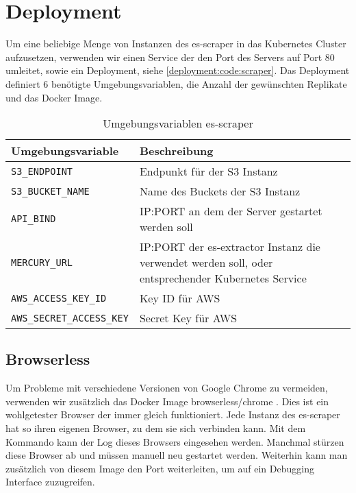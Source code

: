\section{Deployment} \label{scraper:sec:deployment}
Um eine beliebige Menge von Instanzen des es-scraper in das Kubernetes Cluster aufzusetzen, verwenden wir einen Service der den Port des Servers auf Port 80 umleitet, sowie ein Deployment, siehe \autoref{deployment:code:scraper}. Das Deployment definiert 6 benötigte Umgebungsvariablen, die Anzahl der gewünschten Replikate und das Docker Image. \\
\begin{table}[h]
\centering
\begin{tabu}{lX}
	\toprule
	Umgebungsvariable & Beschreibung \\ \midrule
	\texttt{S3\_ENDPOINT}& Endpunkt für der S3 Instanz\\
	\texttt{S3\_BUCKET\_NAME}& Name des Buckets der S3 Instanz\\
	\texttt{API\_BIND}& IP:PORT an dem der Server gestartet werden soll\\
	\texttt{MERCURY\_URL}& IP:PORT der es-extractor Instanz die verwendet werden soll, oder entsprechender Kubernetes Service\\
	\texttt{AWS\_ACCESS\_KEY\_ID} & Key ID für AWS\\
	\texttt{AWS\_SECRET\_ACCESS\_KEY} & Secret Key für AWS\\ \bottomrule
\end{tabu}
\caption{Umgebungsvariablen es-scraper}
\end{table}

\subsection*{Browserless}
Um Probleme mit verschiedene Versionen von Google Chrome zu vermeiden, verwenden wir zusätzlich das Docker Image browserless/chrome \cite{browserless}. Dies ist ein wohlgetester Browser der immer gleich funktioniert. Jede Instanz des es-scraper hat so ihren eigenen Browser, zu dem sie sich verbinden kann. Mit dem Kommando 
kann der Log dieses Browsers eingesehen werden. Manchmal stürzen diese Browser ab und müssen manuell neu gestartet werden. Weiterhin kann man zusätzlich von diesem Image den Port weiterleiten, um auf ein Debugging Interface zuzugreifen.